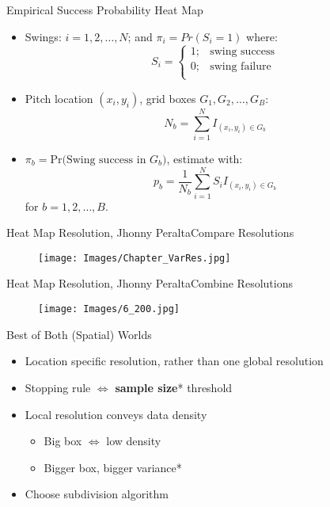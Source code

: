 \documentclass{beamer}
\def\bdm{\begin{displaymath}}
\def\edm{\end{displaymath}}
\begin{document}
\begin{frame}{Empirical Success Probability Heat Map} %

\begin{itemize}
\addtolength{\itemsep}{0.5\baselineskip}
\item Swings: $i = 1,2,\ldots, N$; and $\pi_i = Pr(S_i = 1)$ where:
    \bdm
    S_i = \left\{\begin{array}{ll} 1; & \mbox{swing success} \\
    					 0; & \mbox{swing failure} \\ \end{array} \right.
    \edm

\item Pitch location $(x_i,y_i)$, grid boxes $G_1,G_2,\ldots,G_B$:
    \bdm
    N_b = \sum_{i=1}^N I_{(x_i,y_i) \in G_b}
    \edm
\item $\pi_b = \mbox{Pr(Swing success in }G_b)$, estimate with:
    \bdm
     p_b = \frac{1}{N_b} \sum_{i=1}^N S_i I_{(x_i,y_i) \in G_b}
    \edm
for $b = 1,2,\ldots,B$.
\end{itemize}
\end{frame}

\begin{frame}{Heat Map Resolution, Jhonny Peralta}{Compare Resolutions}
  \begin{figure}[H]
	\centering
	\texttt{[image: Images/Chapter\_VarRes.jpg]}
	\end{figure}
\end{frame}

\begin{frame}{Heat Map Resolution, Jhonny Peralta}{Combine Resolutions}
  \begin{figure}[H]
	\centering
	\texttt{[image: Images/6\_200.jpg]}
	\end{figure}
\end{frame}

\begin{frame}{Best of Both (Spatial) Worlds}{}
\begin{itemize}
\addtolength{\itemsep}{0.5\baselineskip}
\item Location specific resolution, rather than one global resolution
\item Stopping rule $\iff$ {\bf sample size}* threshold
\item Local resolution conveys data density
  \begin{itemize}
  \addtolength{\itemsep}{0.5\baselineskip}
  \item Big box $\iff$ low density
  \item Bigger box, bigger variance*
  \end{itemize}
\item Choose subdivision algorithm
\end{itemize}
\end{frame}
\end{document}
